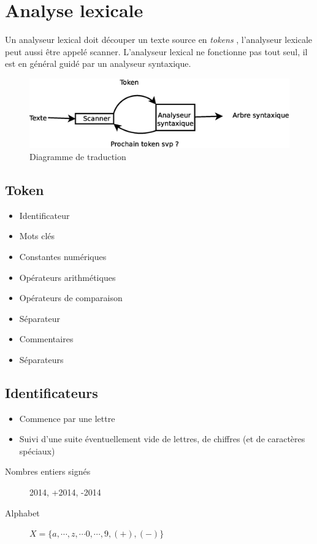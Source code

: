 \documentclass[12pt,a4paper,openany]{book}
\newcommand{\tokens}{\textit{tokens} }
\begin{document}
	\chapter{Analyse lexicale}
	Un analyseur lexical doit découper un texte source en \tokens, l'analyseur lexicale peut aussi être appelé scanner. L'analyseur lexical ne
	fonctionne pas tout seul, il est en général guidé par un analyseur syntaxique.
	\begin{figure}[H]
		\centering
		\includegraphics[width=12cm]{Diagramme4.eps}
		\caption{Diagramme de traduction}
	\end{figure}

	\section{Token}
	\begin{itemize}
		\item Identificateur
		\item Mots clés
		\item Constantes numériques
		\item Opérateurs arithmétiques
		\item Opérateurs de comparaison
		\item Séparateur
		\item Commentaires
		\item Séparateurs
	\end{itemize}
	\section{Identificateurs}
	\begin{itemize}
		\item Commence par une lettre
		\item Suivi d'une suite éventuellement vide de lettres, de chiffres (et de caractères spéciaux)
	\end{itemize}
	\begin{description}
		\item[Nombres entiers signés]2014, +2014, -2014
		\item[Alphabet] $X=\{a,\cdots,z,\cdots 0,\cdots,9,(+),(-)\}$
	\end{description}
\end{document}
